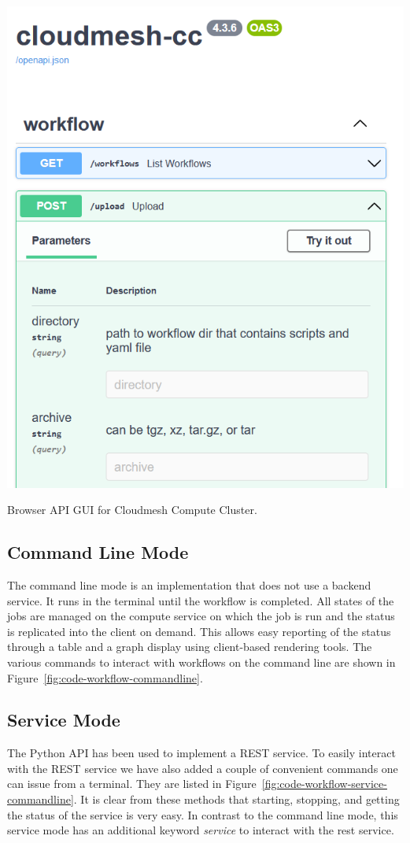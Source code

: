 {\centering
\includegraphics[width=0.52\columnwidth]{images/upload_api.png}
}

\caption{Browser API GUI for Cloudmesh Compute Cluster.}

\label{fig:openapi}


\subsection{Command Line Mode}

The command line mode is an implementation that does not use a backend
service. It runs in the terminal until the workflow is completed. All
states of the jobs are managed on the compute service on which the job
is run and the status is replicated into the client on demand. This
allows easy reporting of the status through a table and a graph
display using client-based rendering tools. The various commands to
interact with workflows on the command line are shown in
Figure~\ref{fig:code-workflow-commandline}.


\subsection{Service Mode}

The Python API has been used to implement a REST service. To easily
interact with the REST service we have also added a couple of
convenient commands one can issue from a terminal. They are listed in
Figure~\ref{fig:code-workflow-service-commandline}. It is clear from
these methods that starting, stopping, and getting the status of the
service is very easy. In contrast to the command line mode, this
service mode has an additional keyword {\em service} to interact with
the rest service.


